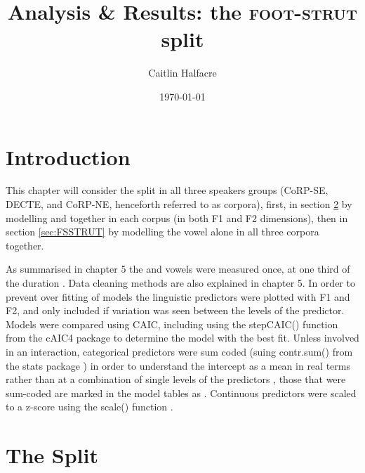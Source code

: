 \documentclass[../../../00.FullDoc/tex/ThesisSkeleton-draft2]{subfiles}
\title{Analysis \& Results: the \textsc{foot}-\textsc{strut} split}
\author{Caitlin Halfacre}
\date{\today}
\begin{document}
	\newcommand{\onlyinsubfile}[1]{#1}
	\newcommand{\notinsubfile}[1]{}
		\maketitle
		\pagebreak
		\tableofcontents
		\onehalfspacing
	\pagestyle{scrheadings}
	
\section{Introduction} \label{sec:FSintro}

This chapter will consider the \FS{} split in all three speakers groups (CoRP-SE, DECTE, and CoRP-NE, henceforth referred to as corpora), first, in section \ref{sec:FSSplit} by modelling \foot{} and \strutt{} together in each corpus (in both F1 and F2 dimensions), then in section \ref{sec:FSSTRUT} by modelling the \strutt{} vowel alone in all three corpora together.

As summarised in chapter \onlyinsubfile{5}\notinsubfile{\ref{ch:Methodology}} the \foot{} and \strutt{} vowels were measured once, at one third of the duration \citep{FAVE}. Data cleaning methods are also explained in chapter \onlyinsubfile{5}\notinsubfile{\ref{ch:Methodology}}.
In order to prevent over fitting of models the linguistic predictors were plotted with F1 and F2, and only included if variation was seen between the levels of the predictor. Models were compared using CAIC, including using the stepCAIC() function from the cAIC4 package \citep{cAIC4} to determine the model with the best fit. Unless involved in an interaction, categorical predictors were sum coded (suing contr.sum() from the stats package \citealt{RCoreTeam2021}) in order to understand the intercept as a mean in real terms rather than at a combination of single levels of the predictors \cite{Winter2019}, those that were sum-coded are marked in the model tables as . Continuous predictors were scaled to a z-score using the scale() function \citep{RCoreTeam2021}.
 
\section{The Split}	 \label{sec:FSSplit}
\end{document}
